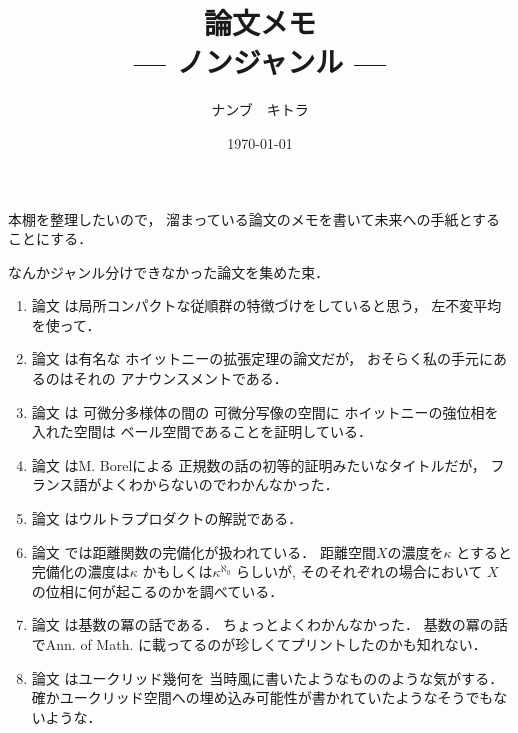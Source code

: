 \documentclass[leqno, a4paper, 12pt]{jsarticle}
\title{論文メモ
\large{\\--- ノンジャンル ---}
}
\author{ナンブ　キトラ}
\date{\today}
\begin{document}
\maketitle

本棚を整理したいので，
溜まっている論文のメモを書いて未来への手紙とすることにする．



なんかジャンル分けできなかった論文を集めた束．


\begin{enumerate}[label=(\arabic*)]

\item 
論文
\cite{MR0277667}
は局所コンパクトな従順群の特徴づけをしていると思う，
左不変平均を使って．


\item 
論文
\cite{MR1501735}
は有名な
ホイットニーの拡張定理の論文だが，
おそらく私の手元にあるのはそれの
アナウンスメントである．


\item 
論文
\cite{MR0697498}
は
可微分多様体の間の
可微分写像の空間に
ホイットニーの強位相を入れた空間は
ベール空間であることを証明している．



\item 
論文
\cite{Sierpinski1917}
はM. Borelによる
正規数の話の初等的証明みたいなタイトルだが，
フランス語がよくわからないのでわかんなかった．


\item 
論文
\cite{MR2757537}
はウルトラプロダクトの解説である．



\item 
論文
\cite{freiwald1973cardinalities}
では距離関数の完備化が扱われている．
距離空間$X$の濃度を$\kappa$
とすると完備化の濃度は$\kappa$
かもしくは$\kappa^{\aleph_{0}}$
らしいが,
そのそれぞれの場合において
$X$の位相に何が起こるのかを調べている．



\item 
論文
\cite{MR0023881}
は基数の冪の話である．
ちょっとよくわかんなかった．
基数の冪の話でAnn. of Math.
に載ってるのが珍しくてプリントしたのかも知れない．



\item 

論文
\cite{MR1506850}
はユークリッド幾何を
当時風に書いたようなもののような気がする．
確かユークリッド空間への埋め込み可能性が書かれていたようなそうでもないような．



\end{enumerate}
\end{document}
